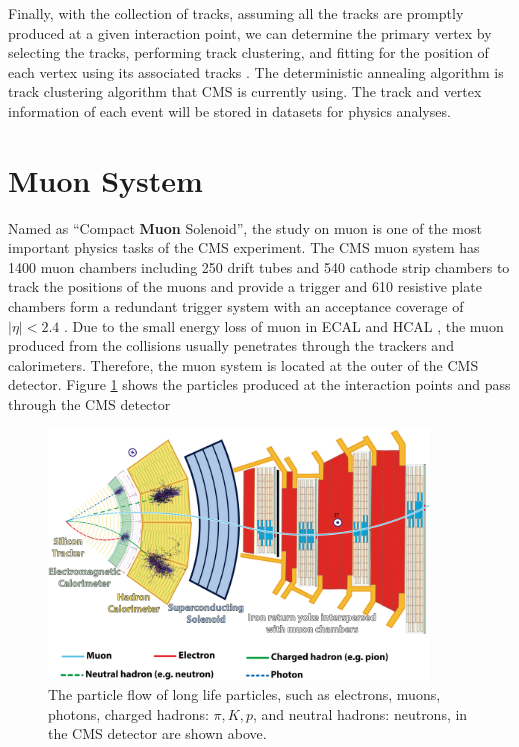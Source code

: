 Finally, with the collection of tracks, assuming all the tracks are promptly produced at a given interaction point, we can determine the primary vertex by selecting the tracks, performing track clustering, and fitting for the position of each vertex using its associated tracks \cite{CMSTrackComp}. The deterministic annealing algorithm \cite{DAAlgo} is track clustering algorithm that CMS is currently using. The track and vertex information of each event will be stored in datasets for physics analyses.

\fi

\section{Muon System}

Named as ``Compact \textbf{Muon} Solenoid'', the study on muon is one of the most important physics tasks of the CMS experiment. The CMS muon system has 1400 muon chambers including 250 drift tubes and 540 cathode strip chambers to track the positions of the muons and provide a trigger and 610 resistive plate chambers form a redundant trigger system with an acceptance coverage of $|\eta| < 2.4$ . Due to the small energy loss of muon in ECAL and HCAL \cite{AlphaTheoEx}, the muon produced from the collisions usually penetrates through the trackers and calorimeters. Therefore, the muon system is located at the outer of the CMS detector. Figure \ref{ParticleFlow} shows the particles produced at the interaction points and pass through the CMS detector

\begin{figure}[hbtp]
\begin{center}
\includegraphics[width=0.90\textwidth]{Figures/Chapter3/CMSParticleFlow.png}
\caption{The particle flow of long life particles, such as electrons, muons, photons, charged hadrons: $\pi,K,p$, and neutral hadrons: neutrons, in the CMS detector are shown above.}
\label{ParticleFlow}
\end{center}
\end{figure} 

